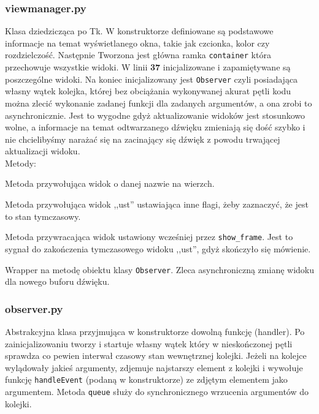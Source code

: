 \documentclass[declaration,shortabstract, inz]{iithesis}
\begin{document}
\subsubsection{view\textunderscore{}manager.py}
% 
    Klasa dziedzicząca po Tk. W konstruktorze definiowane są podstawowe informacje na temat wyświetlanego okna, takie jak czcionka, kolor czy rozdzielczość. Następnie Tworzona jest główna ramka \texttt{container} która przechowuje wszystkie widoki. W linii \textbf{37} inicjalizowane i zapamiętywane są poszczególne widoki. Na koniec inicjalizowany jest \texttt{Observer} czyli posiadająca własny wątek kolejka, której bez obciążania wykonywanej akurat pętli kodu można zlecić wykonanie zadanej funkcji dla zadanych argumentów, a ona zrobi to asynchronicznie. Jest to wygodne gdyż aktualizowanie widoków jest stosunkowo wolne, a informacje na temat odtwarzanego dźwięku zmieniają się dość szybko i nie chcielibyśmy narażać się na zacinający się dźwięk z powodu trwającej aktualizacji widoku. \\
    Metody:
    \begin{description}[style=nextline]
        \item[show\textunderscore{}frame] 
            Metoda przywołująca widok o danej nazwie na wierzch.
        \item[talk\textunderscore{}start]
            Metoda przywołująca widok ,,ust'' ustawiająca inne flagi, żeby zaznaczyć, że jest to stan tymczasowy.
        \item[talk\textunderscore{}stop]
            Metoda przywracająca widok ustawiony wcześniej przez \texttt{show_frame}. Jest to sygnał do zakończenia tymczasowego widoku ,,ust'', gdyż skończyło się mówienie.
        \item[queue\textunderscore{}audio]
            Wrapper na metodę obiektu klasy \texttt{Observer}. Zleca asynchroniczną zmianę widoku dla nowego buforu dźwięku.
    \end{description}


\subsubsection{observer.py}
% 
    Abstrakcyjna klasa przyjmująca w konstruktorze dowolną funkcję (handler). Po zainicjalizowaniu tworzy i startuje własny wątek który w nieskończonej pętli sprawdza co pewien interwał czasowy stan wewnętrznej kolejki. Jeżeli na kolejce wylądowały jakieś argumenty, zdjemuje najstarszy element z kolejki i wywołuje funkcję \texttt{handleEvent} (podaną w konstruktorze) ze zdjętym elementem jako argumentem.
    Metoda \texttt{queue} służy do synchronicznego wrzucenia argumentów do kolejki.
\end{document}
